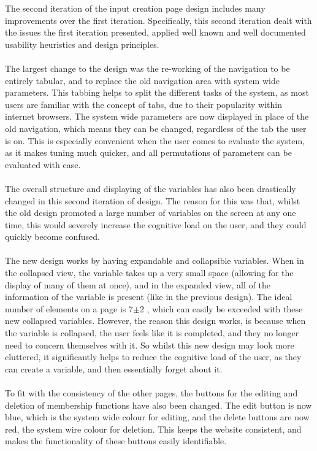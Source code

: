 \noindent 
The second iteration of the input creation page design includes many improvements over the first iteration. Specifically, this second iteration dealt with the issues the first iteration presented, applied well known and well documented usability heuristics and design principles. \ \\
\ \\
The largest change to the design was the re-working of the navigation to be entirely tabular, and to replace the old navigation area with system wide parameters. This tabbing helps to split the different tasks of the system, as most users are familiar with the concept of tabs, due to their popularity within internet browsers. The system wide parameters are now displayed in place of the old navigation, which means they can be changed, regardless of the tab the user is on. This is especially convenient when the user comes to evaluate the system, as it makes tuning much quicker, and all permutations of parameters can be evaluated with ease.\ \\
\ \\
The overall structure and displaying of the variables has also been drastically changed in this second iteration of design. The reason for this was that, whilst the old design promoted a large number of variables on the screen at any one time, this would severely increase the cognitive load on the user, and they could quickly become confused.\ \\
\ \\
The new design works by having expandable and collapsible variables. When in the collapsed view, the variable takes up a very small space (allowing for the display of many of them at once), and in the expanded view, all of the information of the variable is present (like in the previous design). The ideal number of elements on a page is 7$\pm$2 \cite{miller1956magical}, which can easily be exceeded with these new collapsed variables. However, the reason this design works, is because when the variable is collapsed, the user feels like it is completed, and they no longer need to concern themselves with it. So whilst this new design may look more cluttered, it significantly helps to reduce the cognitive load of the user, as they can create a variable, and then essentially forget about it.\ \\
\ \\
To fit with the consistency of the other pages, the buttons for the editing and deletion of membership functions have also been changed. The edit button is now blue, which is the system wide colour for editing, and the delete buttons are now red, the system wire colour for deletion. This keeps the website consistent, and makes the functionality of these buttons easily identifiable.\ \\
